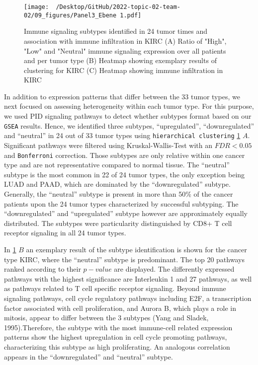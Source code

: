 \documentclass[
  parskip,
  oneside]{scrreprt}
\begin{document}
\begin{figure}
  \texttt{[image: ~/Desktop/GitHub/2022-topic-02-team-02/09\_figures/Panel3\_Ebene 1.pdf]}
  \caption{Immune signaling subtypes identified in 24 tumor times and association with immune infiltration in KIRC (A) Ratio of "High", "Low" and "Neutral" immune signaling expression over all patients and per tumor type (B) Heatmap showing exemplary results of clustering for KIRC (C) Heatmap showing immune infiltration in KIRC}
  \label{pengplot}
\end{figure}

In addition to expression patterns that differ between the 33 tumor
types, we next focused on assessing heterogeneity within each tumor
type. For this purpose, we used PID signaling pathways to detect whether
subtypes format based on our \texttt{GSEA} results. Hence, we identified
three subtypes, ``upregulated'', ``downregulated'' and ``neutral'' in 24
out of 33 tumor types using \texttt{hierarchical\ clustering}
\cref{pengplot} \(A\). Significant pathways were filtered using
Kruskal-Wallis-Test with an \(FDR < 0.05\) and \texttt{Bonferroni}
correction. Those subtypes are only relative within one cancer type and
are not representative compared to normal tissue. The ``neutral''
subtype is the most common in 22 of 24 tumor types, the only exception
being LUAD and PAAD, which are dominated by the ``downregulated''
subtype. Generally, the ``neutral'' subtype is present in more than 50\%
of the cancer patients upon the 24 tumor types characterized by
successful subtyping. The ``downregulated'' and ``upregulated'' subtype
however are approximately equally distributed. The subtypes were
particularity distinguished by CD8+ T cell receptor signaling in all 24
tumor types.

In \cref{pengplot} \(B\) an exemplary result of the subtype
identification is shown for the cancer type KIRC, where the ``neutral''
subtype is predominant. The top 20 pathways ranked according to their
\(p-value\) are displayed. The differently expressed pathways with the
highest significance are Interleukin 1 and 27 pathways, as well as
pathways related to T cell specific receptor signaling. Beyond immune
signaling pathways, cell cycle regulatory pathways including E2F, a
transcription factor associated with cell proliferation, and Aurora B,
which plays a role in mitosis, appear to differ between the 3 subtypes
(Yang and Sladek, 1995).Therefore, the subtype with the most immune-cell
related expression patterns show the highest upregulation in cell cycle
promoting pathways, characterizing this subtype as high proliferating.
An analogous correlation appears in the ``downregulated'' and
``neutral'' subtype.
\end{document}
